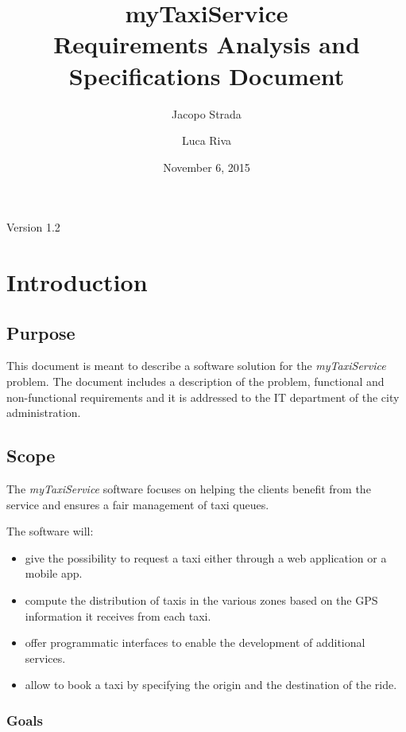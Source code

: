 \documentclass[a4paper]{article}
\title{{\Huge myTaxiService} \\ Requirements Analysis and Specifications Document}
\author{Jacopo Strada \and Luca Riva}
\date{November 6, 2015}
\let\stdsection\section
\renewcommand\section{\newpage\stdsection}
\begin{document}
\maketitle
\vfill
\begin{flushright}
Version 1.2
\end{flushright}
\newpage

\tableofcontents

\listoffigures 

\listoftables

\setlength{\parindent}{0em}
\setlength{\parskip}{1em}

\section{Introduction}
\subsection{Purpose}
This document is meant to describe a software solution for the \emph{myTaxiService} problem. The document includes a description of the problem, functional and non-functional requirements and it is addressed to the IT department of the city administration.

\subsection{Scope}
The \emph{myTaxiService} software focuses on helping the clients benefit from the service and ensures a fair management of taxi queues.

The software will:

\begin{itemize}
\item give the possibility to request a taxi either through a web application or a mobile app.
\item compute the distribution of taxis in the various zones based on the GPS information it receives from each taxi.
\item offer programmatic interfaces to enable the development of additional services.
\item allow to book a taxi by specifying the origin and the destination of the ride.
\end{itemize}

\subsubsection{Goals}
\end{document}
